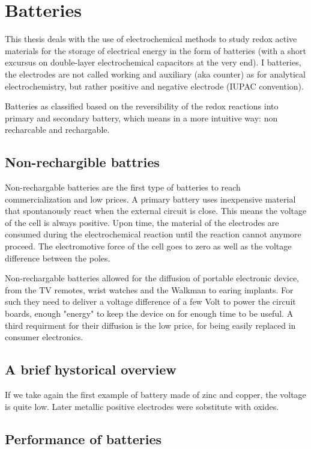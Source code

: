 \chapter{Batteries}
\minitoc

This thesis deals with the use of electrochemical methods to study redox active materials for the storage of electrical energy in the form of batteries (with a short excursus on double-layer electrochemical capacitors at the very end). I batteries, the electrodes are not called working and auxiliary (aka counter) as for analytical electrochemistry, but rather positive and negative electrode (IUPAC convention).

Batteries as classified based on the reversibility of the redox reactions into primary and secondary battery, which means in a more intuitive way: non recharcable and rechargable.

\section{Non-rechargible battries}

Non-rechargable batteries are the first type of batteries to reach commercialization and low prices. A primary battery uses inexpensive material that spontanously react when the external circuit is close. This means the voltage of the cell is always positive. Upon time, the material of the electrodes are consumed during the electrochemical reaction until the reaction cannot anymore proceed. The electromotive force of the cell goes to zero as well as the voltage difference between the poles.

Non-rechargable batteries allowed for the diffusion of portable electronic device, from the TV remotes, wrist watches and the Walkman to earing implants. For such they need to deliver a voltage difference of a few Volt to power the circuit boards, enough "energy" to keep the device on for enough time to be useful. A third requirment for their diffusion is the low price, for being easily replaced in consumer electronics. 

\section{A brief hystorical overview}

If we take again the first example of battery made of zinc and copper, the voltage is quite low. 
Later metallic positive electrodes were sobstitute with oxides. 

\section{Performance of batteries}

